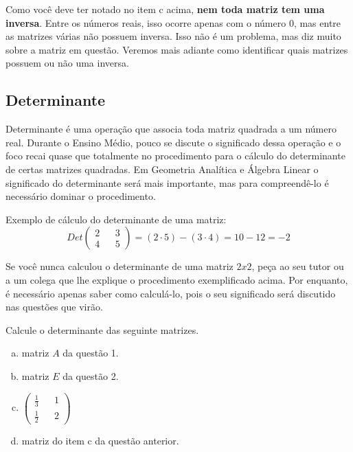 \documentclass[main_estudante.tex]{subfiles}
\begin{document}
Como você deve ter notado no item c acima, \textbf{nem toda matriz tem uma inversa}. Entre os números reais, isso ocorre apenas com o número 0, mas entre as matrizes várias não possuem inversa. Isso não é um problema, mas diz muito sobre a matriz em questão. Veremos mais adiante como identificar quais matrizes possuem ou não uma inversa.

\subsection*{Determinante}

Determinante é uma operação que associa toda matriz quadrada a um número real. Durante o Ensino Médio, pouco se discute o significado dessa operação e o foco recai quase que totalmente no procedimento para o cálculo do determinante de certas matrizes quadradas. Em Geometria Analítica e Álgebra Linear o significado do determinante será mais importante, mas para compreendê-lo é necessário dominar o procedimento.

\begin{caixaExemplo}
	Exemplo de cálculo do determinante de uma matriz:
	$$ Det \begin{pmatrix} 2 && 3 \\ 4 && 5 \end{pmatrix} = (2 \cdot 5) - (3 \cdot 4) = 10-12=-2$$
\end{caixaExemplo}

Se você nunca calculou o determinante de uma matriz $2x2$, peça ao seu tutor ou a um colega que lhe explique o procedimento exemplificado acima. Por enquanto, é necessário apenas saber como calculá-lo, pois o seu significado será discutido nas questões que virão.

\begin{questao}
Calcule o determinante das seguinte matrizes.
\begin{enumerate}[a)]
\item matriz $A$ da questão 1.
\item matriz $E$ da questão 2.
\item $\begin{pmatrix} \frac{1}{3} && 1 \\ \frac{1}{2} && 2 \end{pmatrix}$
\item matriz do item c da questão anterior.
\end{enumerate}
\end{questao}
\end{document}
